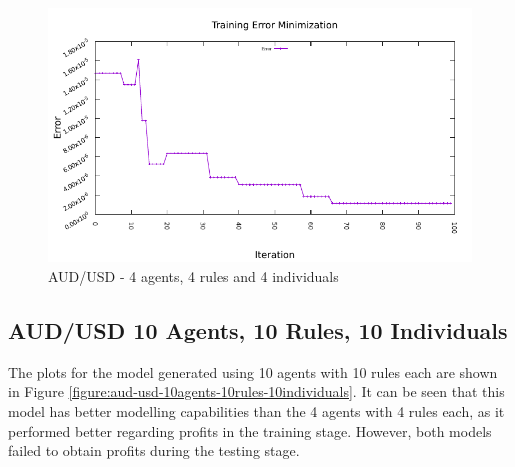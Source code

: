 \begin{figure}[htp]
  \medskip

  \includegraphics[width=.45\textwidth]{img/plots/aud_usd_h1-4agents-4rules-4ind-100gen_error_minimization.pdf}

  \caption{AUD/USD - 4 agents, 4 rules and 4 individuals}
  \label{figure:aud-usd-4agents-4rules-4individuals}
\end{figure}

\newpage

\subsection{AUD/USD 10 Agents, 10 Rules, 10 Individuals}
\label{results:forecast-aud-usd-10agents-10rules-10individuals}

The plots for the model generated using 10 agents with 10 rules each are shown in Figure \ref{figure:aud-usd-10agents-10rules-10individuals}. It can be seen that this model has better modelling capabilities than the 4 agents with 4 rules each, as it performed better regarding profits in the training stage. However, both models failed to obtain profits during the testing stage.

